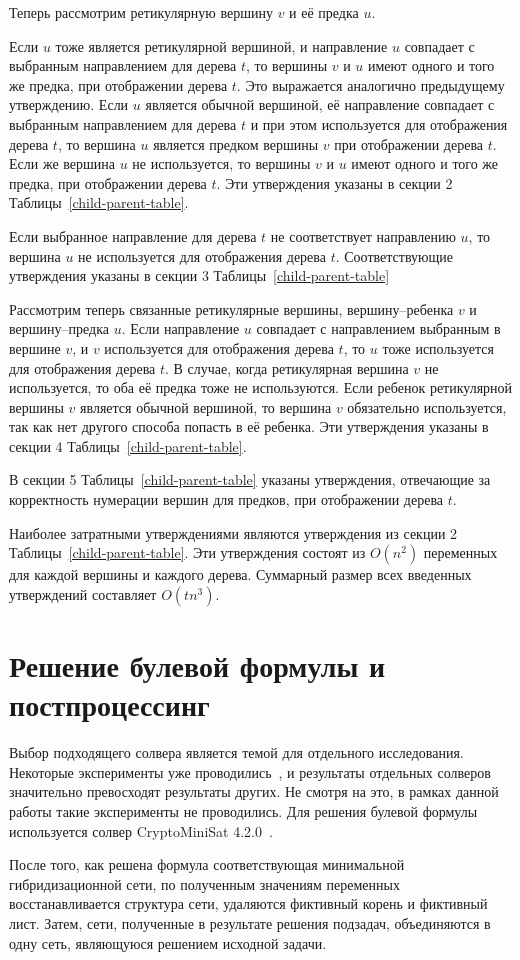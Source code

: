 Теперь рассмотрим ретикулярную вершину $v$ и её предка $u$.

Если $u$ тоже является ретикулярной вершиной, и направление $u$ совпадает с выбранным направлением для дерева $t$, то вершины $v$ и $u$ имеют одного и того же предка, при отображении дерева $t$.
Это выражается аналогично предыдущему утверждению.
Если $u$ является обычной вершиной, её направление совпадает с выбранным направлением для дерева $t$ и при этом используется для отображения дерева $t$, то вершина $u$ является предком вершины $v$ при отображении дерева $t$.
Если же вершина $u$ не используется, то вершины $v$ и $u$ имеют одного и того же предка, при отображении дерева $t$.
Эти утверждения указаны в секции 2 Таблицы~\ref{child-parent-table}.

Если выбранное направление для дерева $t$ не соответствует направлению $u$, то вершина $u$ не используется для отображения дерева $t$.
Соответствующие утверждения указаны в секции 3 Таблицы~\ref{child-parent-table}

Рассмотрим теперь связанные ретикулярные вершины, вершину--ребенка $v$ и вершину--предка $u$.
Если направление $u$ совпадает с направлением выбранным в вершине $v$, и $v$ используется для отображения дерева $t$, то $u$ тоже используется для отображения дерева $t$.
В случае, когда ретикулярная вершина $v$ не используется, то оба её предка тоже не используются.
Если ребенок ретикулярной вершины $v$ является обычной вершиной, то вершина $v$ обязательно используется, так как нет другого способа попасть в её ребенка.
Эти утверждения указаны в секции 4 Таблицы~\ref{child-parent-table}.

В секции 5 Таблицы~\ref{child-parent-table} указаны утверждения, отвечающие за корректность нумерации вершин для предков, при отображении дерева $t$.

Наиболее затратными утверждениями являются утверждения из секции 2 Таблицы~\ref{child-parent-table}.
Эти утверждения состоят из $O(n^2)$ переменных для каждой вершины и каждого дерева.
Суммарный размер всех введенных утверждений составляет $O(tn^3)$.

\FloatBarrier
\section{Решение булевой формулы и постпроцессинг}

Выбор подходящего солвера является темой для отдельного исследования. Некоторые эксперименты уже проводились~\cite{bonet2009efficiently}, и результаты отдельных солверов значительно превосходят результаты других. Не смотря на это, в рамках данной работы такие эксперименты не проводились. Для решения булевой формулы используется солвер CryptoMiniSat 4.2.0~\cite{cryptominisat}.

После того, как решена формула соответствующая минимальной гибридизационной сети, по полученным значениям переменных восстанавливается структура сети, удаляются фиктивный корень и фиктивный лист.
Затем, сети, полученные в результате решения подзадач, объединяются в одну сеть, являющуюся решением исходной задачи.